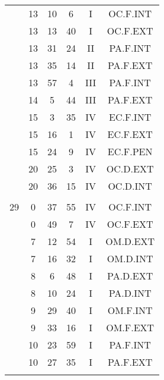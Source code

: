 \documentclass[12pt, a4paper]{article}
\begin{document}
\begin{multicols}{3}
{\begin{tabular}{c c c c c c}
	 	 	 	 & 13 & 10 & 6 & I & OC.F.INT\\%
	 	 	 	 & 13 & 13 & 40 & I & OC.F.EXT\\%
	 	 	 	 & 13 & 31 & 24 & II & PA.F.INT\\%
	 	 	 	 & 13 & 35 & 14 & II & PA.F.EXT\\%
	 	 	 	 & 13 & 57 & 4 & III & PA.F.INT\\%
	 	 	 	 & 14 & 5 & 44 & III & PA.F.EXT\\%
	 	 	 	 & 15 & 3 & 35 & IV & EC.F.INT\\%
	 	 	 	 & 15 & 16 & 1 & IV & EC.F.EXT\\%
	 	 	 	 & 15 & 24 & 9 & IV & EC.F.PEN\\%
	 	 	 	 & 20 & 25 & 3 & IV & OC.D.EXT\\%
	 	 	 	 & 20 & 36 & 15 & IV & OC.D.INT\\%
	 	 	 	 & & & & & \\%
	 	 	 	29 & 0 & 37 & 55 & IV & OC.F.INT\\%
	 	 	 	 & 0 & 49 & 7 & IV & OC.F.EXT\\%
	 	 	 	 & 7 & 12 & 54 & I & OM.D.EXT\\%
	 	 	 	 & 7 & 16 & 32 & I & OM.D.INT\\%
	 	 	 	 & 8 & 6 & 48 & I & PA.D.EXT\\%
	 	 	 	 & 8 & 10 & 24 & I & PA.D.INT\\%
	 	 	 	 & 9 & 29 & 40 & I & OM.F.INT\\%
	 	 	 	 & 9 & 33 & 16 & I & OM.F.EXT\\%
	 	 	 	 & 10 & 23 & 59 & I & PA.F.INT\\%
	 	 	 	 & 10 & 27 & 35 & I & PA.F.EXT\\%
	 	 	 	 & & & & & \\%

\end{tabular}}
\end{multicols}
\end{document}
